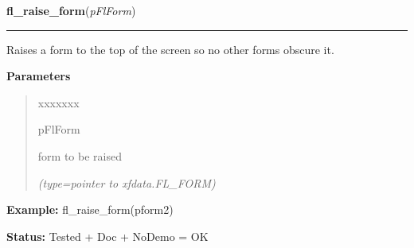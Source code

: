     \vspace{0.5ex}

\hspace{.8\funcindent}\begin{boxedminipage}{\funcwidth}

    \raggedright \textbf{fl\_raise\_form}(\textit{pFlForm})

    \vspace{-1.5ex}

    \rule{\textwidth}{0.5\fboxrule}
\setlength{\parskip}{2ex}
    Raises a form to the top of the screen so no other forms obscure it.

\setlength{\parskip}{1ex}
      \textbf{Parameters}
      \vspace{-1ex}

      \begin{quote}
        \begin{Ventry}{xxxxxxx}

          \item[pFlForm]

          form to be raised

            {\it (type=pointer to xfdata.FL\_FORM)}

        \end{Ventry}

      \end{quote}

\textbf{Example:} fl\_raise\_form(pform2)



\textbf{Status:} Tested + Doc + NoDemo = OK



    \end{boxedminipage}

    \label{xformslib:flxbasic:fl_lower_form}

    \vspace{0.5ex}

